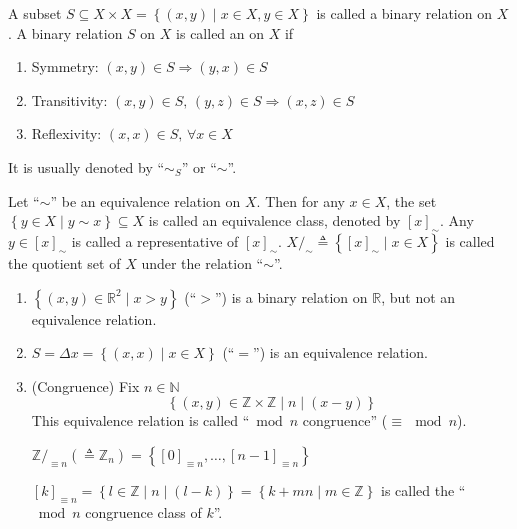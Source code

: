 \begin{definition}
    A subset $S\subseteq X\times X=\left\{(x,y)\mid x\in X,y\in X\right\}$ is called a binary relation on $X$. A binary relation $S$ on $X$ is called an  on $X$ if
    \begin{enumerate}
        \item Symmetry: $(x,y)\in S\Rightarrow (y,x)\in S$
        \item Transitivity: $(x,y)\in S,\,(y,z)\in S\Rightarrow (x,z)\in S$
        \item Reflexivity: $(x,x)\in S,\,\forall x\in X$
    \end{enumerate}
    It is usually denoted by ``$\sim_S$'' or ``$\sim$''.
\end{definition}

\begin{definition}
    Let ``$\sim$'' be an equivalence relation on $X$. Then for any $x\in X$, the set $\left\{y\in X\mid y\sim x\right\}\subseteq X$ is called an equivalence class, denoted by $[x]_\sim$. Any $y\in[x]_\sim$ is called a representative of $[x]_\sim$. $X/_\sim\triangleq \left\{[x]_\sim\mid x\in X\right\}$ is called the quotient set of $X$ under the relation ``$\sim$''.
\end{definition}

\begin{example}
    \begin{enumerate}
        \item $\left\{(x,y)\in\mathbb{R}^2\mid x>y \right\}$ (``$>$'') is a binary relation on $\mathbb{R}$, but not an equivalence relation.
        \item $S=\Delta x=\left\{(x,x)\mid x\in X\right\}$ (``$=$'') is an equivalence relation.
        \item (Congruence) Fix $n\in\mathbb{N}$
              $$\left\{(x,y)\in\mathbb{Z}\times\mathbb{Z}\mid n\mid(x-y)\right\}$$
              This equivalence relation is called ``$\bmod n$ congruence'' ($\equiv\,\bmod n$).

              $\mathbb{Z}/_{\equiv n}\left(\triangleq\mathbb{Z}_n\right)=\left\{[0]_{\equiv n},\dots,[n-1]_{\equiv n}\right\}$\\

              $[k]_{\equiv n}=\left\{l\in\mathbb{Z}\mid n\mid(l-k)\right\}=\left\{k+mn\mid m\in\mathbb{Z}\right\}$ is called the ``$\bmod n$ congruence class of $k$''.
    \end{enumerate}
\end{example}

